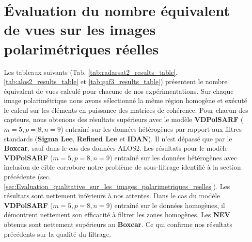 \section{Évaluation du nombre équivalent de vues sur les images polarimétriques réelles}

Les tableaux suivants (Tab.  \ref{tab:radarsat2_results_table}, \ref{tab:alos2_results_table} et \ref{tab:gaf3_results_table}) présentent le nombre équivalent de vues calculé pour chacune de nos expérimentations.  Sur chaque image polarimétrique nous avons sélectionné la même région homogène et exécuté le calcul sur les éléments en puissance des matrices de cohérence.  Pour chacun des capteurs, nous obtenons des résultats supérieurs avec le modèle \textbf{VDPolSARF} ($m=5, p=8, n=9$) entraîné sur les données hétérogènes par rapport aux filtres standards (\textbf{Sigma Lee}, \textbf{Refined Lee }et \textbf{IDAN}). Il n'est dépassé que par le \textbf{Boxcar}, sauf dans le cas des données ALOS2.  Les résultats pour le modèle \textbf{VDPolSARF} ($m=5, p=8, n=9$) entraîné sur les données hétérogènes avec inclusion de cible corrobore notre problème de sous-filtrage identifié à la section précédente (sec. \ref{sec:Evaluation_qualitative_sur_les_images_polarimetriques_reelles}).  Les résultats sont nettement inférieurs à nos attentes.  Dans le cas du  modèle \textbf{VDPolSARF} ($m=5, p=8, n=9$) entraîné sur le données homogènes, il démontrent nettement son efficacité à filtrer les zones homogènes. Les \textbf{NEV} obtenus sont nettement supérieurs au \textbf{Boxcar}.  Ce qui confirme nos résultats précédents sur la qualité du filtrage.

\vspace{5pt}

